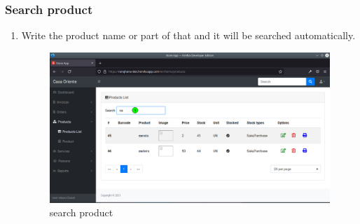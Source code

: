 \documentclass[a4paper,11pt]{refart}
\begin{document}
\subsubsection{Search product}
\begin{enumerate}
	\item Write the product name or part of that and it will be searched automatically.
	\begin{figure}[H]\centering
		\includegraphics[width=\textwidth]{images/produc_list-search.png}
		\caption{search product}
		\label{fig:produc_list-search.png}
	\end{figure}
\end{enumerate}
\end{document}

